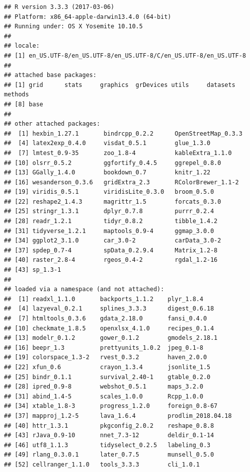 \documentclass[12pt,a4paper,openany]{book}
\theoremstyle{definition}
\theoremstyle{definition}
\theoremstyle{definition}
\theoremstyle{remark}
\begin{document}
\begin{verbatim}
## R version 3.3.3 (2017-03-06)
## Platform: x86_64-apple-darwin13.4.0 (64-bit)
## Running under: OS X Yosemite 10.10.5
## 
## locale:
## [1] en_US.UTF-8/en_US.UTF-8/en_US.UTF-8/C/en_US.UTF-8/en_US.UTF-8
## 
## attached base packages:
## [1] grid      stats     graphics  grDevices utils     datasets  methods  
## [8] base     
## 
## other attached packages:
##  [1] hexbin_1.27.1       bindrcpp_0.2.2      OpenStreetMap_0.3.3
##  [4] latex2exp_0.4.0     visdat_0.5.1        glue_1.3.0         
##  [7] lmtest_0.9-35       zoo_1.8-4           kableExtra_1.1.0   
## [10] olsrr_0.5.2         ggfortify_0.4.5     ggrepel_0.8.0      
## [13] GGally_1.4.0        bookdown_0.7        knitr_1.22         
## [16] wesanderson_0.3.6   gridExtra_2.3       RColorBrewer_1.1-2 
## [19] viridis_0.5.1       viridisLite_0.3.0   broom_0.5.0        
## [22] reshape2_1.4.3      magrittr_1.5        forcats_0.3.0      
## [25] stringr_1.3.1       dplyr_0.7.8         purrr_0.2.4        
## [28] readr_1.2.1         tidyr_0.8.2         tibble_1.4.2       
## [31] tidyverse_1.2.1     maptools_0.9-4      ggmap_3.0.0        
## [34] ggplot2_3.1.0       car_3.0-2           carData_3.0-2      
## [37] spdep_0.7-4         spData_0.2.9.4      Matrix_1.2-8       
## [40] raster_2.8-4        rgeos_0.4-2         rgdal_1.2-16       
## [43] sp_1.3-1           
## 
## loaded via a namespace (and not attached):
##  [1] readxl_1.1.0       backports_1.1.2    plyr_1.8.4        
##  [4] lazyeval_0.2.1     splines_3.3.3      digest_0.6.18     
##  [7] htmltools_0.3.6    gdata_2.18.0       fansi_0.4.0       
## [10] checkmate_1.8.5    openxlsx_4.1.0     recipes_0.1.4     
## [13] modelr_0.1.2       gower_0.1.2        gmodels_2.18.1    
## [16] beepr_1.3          prettyunits_1.0.2  jpeg_0.1-8        
## [19] colorspace_1.3-2   rvest_0.3.2        haven_2.0.0       
## [22] xfun_0.6           crayon_1.3.4       jsonlite_1.5      
## [25] bindr_0.1.1        survival_2.40-1    gtable_0.2.0      
## [28] ipred_0.9-8        webshot_0.5.1      maps_3.2.0        
## [31] abind_1.4-5        scales_1.0.0       Rcpp_1.0.0        
## [34] xtable_1.8-3       progress_1.2.0     foreign_0.8-67    
## [37] mapproj_1.2-5      lava_1.6.4         prodlim_2018.04.18
## [40] httr_1.3.1         pkgconfig_2.0.2    reshape_0.8.8     
## [43] rJava_0.9-10       nnet_7.3-12        deldir_0.1-14     
## [46] utf8_1.1.3         tidyselect_0.2.5   labeling_0.3      
## [49] rlang_0.3.0.1      later_0.7.5        munsell_0.5.0     
## [52] cellranger_1.1.0   tools_3.3.3        cli_1.0.1         

\end{verbatim}
\end{document}
